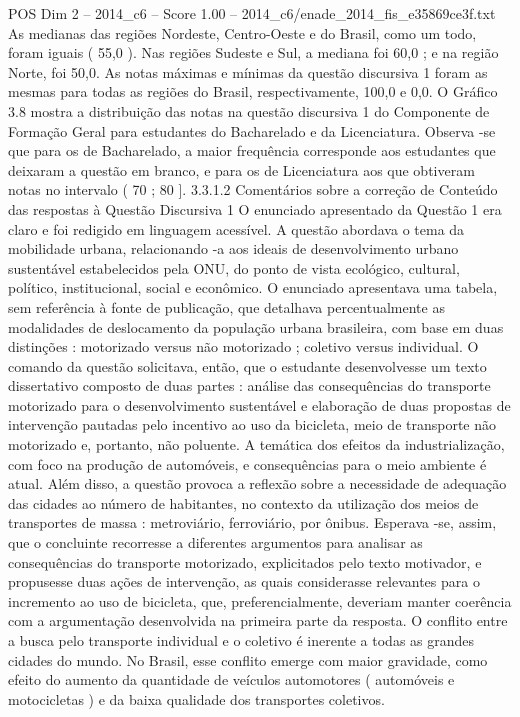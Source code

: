 \begin{textsample}{POS Dim 2 – 2014\_c6 – Score 1.00 – 2014\_c6/enade\_2014\_fis\_e35869ce3f.txt}
As medianas das regiões Nordeste, Centro-Oeste e do Brasil, como um todo, foram iguais ( 55,0 ).
Nas regiões Sudeste e Sul, a mediana foi 60,0 ; e na região Norte, foi 50,0.
As notas máximas e mínimas da questão discursiva 1 foram as mesmas para todas as regiões do Brasil, respectivamente, 100,0 e 0,0.
O Gráfico 3.8 mostra a distribuição das notas na questão discursiva 1 do Componente de Formação Geral para estudantes do Bacharelado e da Licenciatura.
Observa -se que para os de Bacharelado, a maior frequência corresponde aos estudantes que deixaram a questão em branco, e para os de Licenciatura aos que obtiveram notas no intervalo ( 70 ; 80 ]. 3.3.1.2 Comentários sobre a correção de Conteúdo das respostas à Questão Discursiva 1 O enunciado apresentado da Questão 1 era claro e foi redigido em linguagem acessível.
A questão abordava o tema da mobilidade urbana, relacionando -a aos ideais de desenvolvimento urbano sustentável estabelecidos pela ONU, do ponto de vista ecológico, cultural, político, institucional, social e econômico.
O enunciado apresentava uma tabela, sem referência à fonte de publicação, que detalhava percentualmente as modalidades de deslocamento da população urbana brasileira, com base em duas distinções : motorizado versus não motorizado ; coletivo versus individual.
O comando da questão solicitava, então, que o estudante desenvolvesse um texto dissertativo composto de duas partes : análise das consequências do transporte motorizado para o desenvolvimento sustentável e elaboração de duas propostas de intervenção pautadas pelo incentivo ao uso da bicicleta, meio de transporte não motorizado e, portanto, não poluente.
A temática dos efeitos da industrialização, com foco na produção de automóveis, e consequências para o meio ambiente é atual.
Além disso, a questão provoca a reflexão sobre a necessidade de adequação das cidades ao número de habitantes, no contexto da utilização dos meios de transportes de massa : metroviário, ferroviário, por ônibus.
Esperava -se, assim, que o concluinte recorresse a diferentes argumentos para analisar as consequências do transporte motorizado, explicitados pelo texto motivador, e propusesse duas ações de intervenção, as quais considerasse relevantes para o incremento ao uso de bicicleta, que, preferencialmente, deveriam manter coerência com a argumentação desenvolvida na primeira parte da resposta.
O conflito entre a busca pelo transporte individual e o coletivo é inerente a todas as grandes cidades do mundo.
No Brasil, esse conflito emerge com maior gravidade, como efeito do aumento da quantidade de veículos automotores ( automóveis e motocicletas ) e da baixa qualidade dos transportes coletivos.

\end{textsample}
